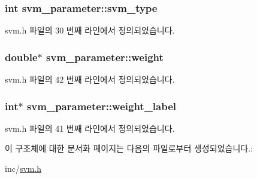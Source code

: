 \hypertarget{structsvm__parameter_a3afb37272180a903df05f7b649b338f4}{
\subsubsection[{svm\+\_\+type}]{\setlength{\rightskip}{0pt plus 5cm}int svm\+\_\+parameter\+::svm\+\_\+type}}\label{structsvm__parameter_a3afb37272180a903df05f7b649b338f4}


svm.\+h 파일의 30 번째 라인에서 정의되었습니다.

\hypertarget{structsvm__parameter_afff750f99180b5ddf735404496b6c196}{
\subsubsection[{weight}]{\setlength{\rightskip}{0pt plus 5cm}double$\ast$ svm\+\_\+parameter\+::weight}}\label{structsvm__parameter_afff750f99180b5ddf735404496b6c196}


svm.\+h 파일의 42 번째 라인에서 정의되었습니다.

\hypertarget{structsvm__parameter_a06753922bb0282240f35ae7683f8d69a}{
\subsubsection[{weight\+\_\+label}]{\setlength{\rightskip}{0pt plus 5cm}int$\ast$ svm\+\_\+parameter\+::weight\+\_\+label}}\label{structsvm__parameter_a06753922bb0282240f35ae7683f8d69a}


svm.\+h 파일의 41 번째 라인에서 정의되었습니다.



이 구조체에 대한 문서화 페이지는 다음의 파일로부터 생성되었습니다.\+:\begin{DoxyCompactItemize}
\item 
inc/\hyperlink{svm_8h}{svm.\+h}\end{DoxyCompactItemize}
